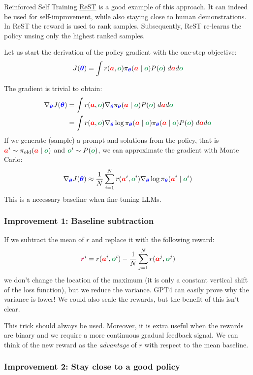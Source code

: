 \documentclass{article}
\newcommand{\colsym}[2]{\ensuremath{\textcolor{#1}{\boldsymbol{#2}}}}
\newcommand{\action}{\colsym{red}{a}}
\newcommand{\obs}{\colsym{ForestGreen}{o}}
\newcommand{\reward}{\colsym{purple}{r}}
\newcommand{\params}{\colsym{blue}{\theta}}
\begin{document}
Reinforced Self Training \href{https://arxiv.org/abs/2308.08998}{ReST} is a good example of this approach. It can indeed be used for self-improvement, while also staying close to human demonstrations. In ReST the reward is used to rank samples. Subsequently, ReST re-learns the policy unsing only the highest ranked samples.

Let us start the derivation of the policy gradient with the one-step objective:
\[
J(\params) = \int r(\action, \obs) \pi_{\params}(\action \mid \obs) P(\obs) \; d\action d\obs
\]

The gradient is trivial to obtain:
\begin{align*}
\nabla_{\params} J(\params) &= \int r(\action, \obs) \nabla_{\params} \pi_{\params}(\action \mid \obs) P(\obs) \; d\action d\obs \\
&= \int r(\action, \obs) \nabla_{\params} \log \pi_{\params}(\action \mid \obs) \pi_{\params}(\action \mid \obs) P(\obs) \; d\action d\obs
\end{align*}
If we generate (sample) a prompt and solutions from the policy, that is $\action^i \sim \pi_{\text{old}}(\action \mid \obs)$ and $\obs^i \sim P(\obs)$, we can approximate the gradient with Monte Carlo:
\[
\nabla_{\params} J(\params) \approx \frac{1}{N} \sum_{i=1}^N r(\action^i, \obs^i) \nabla_{\params} \log \pi_{\params}(\action^i \mid \obs^i)
\]
This is a necessary baseline when fine-tuning LLMs.


\subsubsection{Improvement 1: Baseline subtraction}

If we subtract the mean of $r$ and replace it with the following reward:
\[
   \reward^i = r(\action^i, \obs^i) - \frac{1}{N} \sum_{j=1}^N r(\action^j, \obs^j)
\]
we don't change the location of the maximum (it is only a constant vertical shift of the loss function), but we reduce the variance. GPT4 can easily prove why the variance is lower! We could also scale the rewards, but the benefit of this isn't clear.

This trick should always be used. Moreover, it is extra useful when the rewards are binary and we require a more continuous gradual feedback signal. We can think of the new reward as the \emph{advantage} of $r$ with respect to the mean baseline.



\subsubsection{Improvement 2: Stay close to a good policy}
\end{document}
